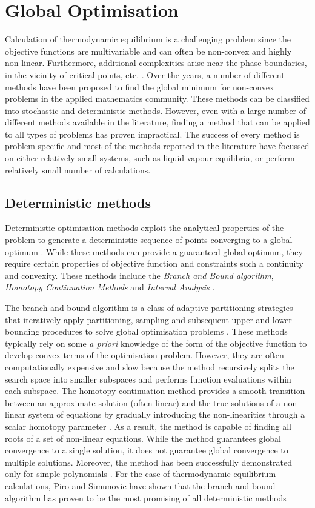 	\section{Global Optimisation}
	Calculation of thermodynamic equilibrium is a challenging problem since the objective functions are multivariable and can often be non-convex and highly non-linear. Furthermore, additional complexities arise near the phase boundaries, in the vicinity of critical points, etc. \cite{Wakeham04,TEH2002745}. Over the years, a number of different methods have been proposed to find the global minimum for non-convex problems in the applied mathematics community. These methods can be classified into stochastic and deterministic methods. However, even with a large number of different methods available in the literature, finding a method that can be applied to all types of problems has proven impractical. The success of every method is problem-specific and most of the methods reported in the literature have focussed on either relatively small systems, such as liquid-vapour equilibria, or perform relatively small number of calculations.

	\subsection{Deterministic methods}
	Deterministic optimisation methods exploit the analytical properties of the problem to generate a deterministic sequence of points converging to a global optimum \cite{PARDALOS2000209}. While these methods can provide a guaranteed global optimum, they require certain properties of objective function and constraints such a continuity and convexity. These methods include the \emph{Branch and Bound algorithm}, \emph{Homotopy Continuation Methods}  and \emph{Interval Analysis} \cite{Floudas99}.

	The branch and bound algorithm is a class of adaptive partitioning strategies that iteratively apply partitioning, sampling and subsequent upper and lower bounding procedures to solve global optimisation problems \cite{Floudas99}.  These methods typically rely on some \textit{a priori} knowledge of the form of the objective function to  develop convex terms of the optimisation problem. However, they are often computationally expensive and slow \cite{Wakeham04,Nichita02} because the method recursively splits the search space into smaller subspaces and performs function evaluations within each subspace. The homotopy continuation method provides a smooth transition between an approximate solution (often linear) and the true solutions of a non-linear system of equations by gradually introducing the non-linearities through a scalar homotopy parameter \cite{B.-Riggs:1994aa,JALALI20082333}. As a result, the method is capable of finding all roots of a set of non-linear equations. While the method guarantees global convergence to a single solution, it does not guarantee global convergence to multiple solutions. Moreover, the method has been successfully demonstrated only for simple polynomials \cite{Zhang11}.
For the case of thermodynamic equilibrium calculations, Piro and Simunovic \cite{Piro16} have shown that the branch and bound algorithm has proven to be the most promising of all deterministic methods

